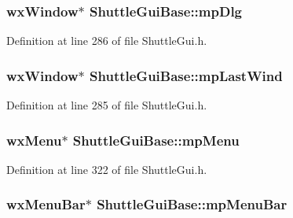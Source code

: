 \subsubsection[{\texorpdfstring{mp\+Dlg}{mpDlg}}]{\setlength{\rightskip}{0pt plus 5cm}wx\+Window$\ast$ Shuttle\+Gui\+Base\+::mp\+Dlg\hspace{0.3cm}{\ttfamily [protected]}}\hypertarget{class_shuttle_gui_base_aea7401af88ba1164527a04888fd40da0}{}\label{class_shuttle_gui_base_aea7401af88ba1164527a04888fd40da0}


Definition at line 286 of file Shuttle\+Gui.\+h.

\subsubsection[{\texorpdfstring{mp\+Last\+Wind}{mpLastWind}}]{\setlength{\rightskip}{0pt plus 5cm}wx\+Window$\ast$ Shuttle\+Gui\+Base\+::mp\+Last\+Wind\hspace{0.3cm}{\ttfamily [protected]}}\hypertarget{class_shuttle_gui_base_a2c08d2097364121d9b29de626e4fbd79}{}\label{class_shuttle_gui_base_a2c08d2097364121d9b29de626e4fbd79}


Definition at line 285 of file Shuttle\+Gui.\+h.

\subsubsection[{\texorpdfstring{mp\+Menu}{mpMenu}}]{\setlength{\rightskip}{0pt plus 5cm}wx\+Menu$\ast$ Shuttle\+Gui\+Base\+::mp\+Menu\hspace{0.3cm}{\ttfamily [protected]}}\hypertarget{class_shuttle_gui_base_ad3daa563aec7b0437c07161692e98145}{}\label{class_shuttle_gui_base_ad3daa563aec7b0437c07161692e98145}


Definition at line 322 of file Shuttle\+Gui.\+h.

\subsubsection[{\texorpdfstring{mp\+Menu\+Bar}{mpMenuBar}}]{\setlength{\rightskip}{0pt plus 5cm}wx\+Menu\+Bar$\ast$ Shuttle\+Gui\+Base\+::mp\+Menu\+Bar\hspace{0.3cm}{\ttfamily [protected]}}\hypertarget{class_shuttle_gui_base_a13505efc7acfb506da539cb32b6ba7cc}{}\label{class_shuttle_gui_base_a13505efc7acfb506da539cb32b6ba7cc}


